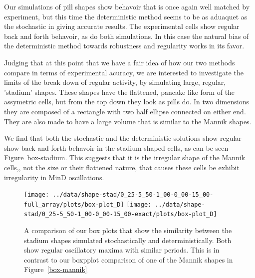 \documentclass[letterpaper,twocolumn,amsmath,amssymb,pre]{revtex4-1}
\begin{document}
Our simulations of pill shapes show behavoir that is once again well
matched by experiment, but this time the deterministic method seems to
be as aduaquet as the stochastic in giving accurate results.  The
experimental cells show regular back and forth behavoir, as do both
simulations.  In this case the natural bias of the deterministic
method towards robustness and regularity works in its favor.

Judging that at this point that we have a fair idea of how our two
methods compare in terms of experimental acuracy, we are interested to
investigate the limits of the break down of regular activity, by
simulating large, regular, 'stadium' shapes.  These shapes have the
flattened, pancake like form of the assymetric cells, but from the top
down they look as pills do. In two dimensions they are composed of a
rectangle with two half ellipse connected on either end.  They are
also made to have a large volume that is similar to the Mannik shapes.

We find that both the stochastic and the deterministic solutions show
regular show back and forth behavoir in the stadium shaped cells, as
can be seen Figure~{box-stadium}.  This suggests that it is the
irregular shape of the Mannik cells,, not the size or their flattened
nature, that causes these cells be exhibit irregularity in MinD
oscillations.

\begin{figure}
  \texttt{[image: ../data/shape-stad/0\_25-5\_50-1\_00-0\_00-15\_00-full\_array/plots/box-plot\_D]}
  \texttt{[image: ../data/shape-stad/0\_25-5\_50-1\_00-0\_00-15\_00-exact/plots/box-plot\_D]}
  \caption{A comparison of our box plots that show the similarity
    between the stadium shapes simulated stochastically and
    deterministically.  Both show regular oscillatory maxima with
    similar periods.  This is in contrast to our boxpplot comparison
    of one of the Mannik shapes in Figure~\ref{box-mannik}}
  \label{box-stadium}
\end{figure}
\end{document}
